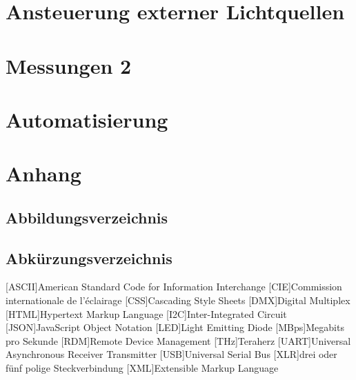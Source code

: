 \documentclass[11pt]{scrartcl}
\begin{document}
\section{Ansteuerung externer Lichtquellen}
\clearpage

\section{Messungen 2}
\clearpage

\section{Automatisierung}
\clearpage

\renewcommand{\thesubsection}{\Alph{subsection}}
\section*{Anhang}

\subsection{Abbildungsverzeichnis}
\begingroup
\renewcommand{\section}[2]{}
\listoffigures
\endgroup
\clearpage

\subsection{Abkürzungsverzeichnis}
\begin{acronym}
    [ASCII]{American Standard Code for Information Interchange}
    [CIE]{Commission internationale de l’éclairage}
    [CSS]{Cascading Style Sheets}
    [DMX]{Digital Multiplex}
    [HTML]{Hypertext Markup Language}
    [I2C]{Inter-Integrated Circuit}
    [JSON]{JavaScript Object Notation}
    [LED]{Light Emitting Diode}
    [MBps]{Megabits pro Sekunde}
    [RDM]{Remote Device Management}
    [THz]{Teraherz}
    [UART]{Universal Asynchronous Receiver Transmitter}
    [USB]{Universal Serial Bus}
    [XLR]{drei oder fünf polige Steckverbindung}
    [XML]{Extensible Markup Language}
\end{acronym}
\clearpage
\end{document}
